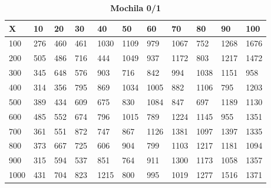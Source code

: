 \documentclass[10pt,letterpaper]{article}
\begin{document}
\newpage 
{}
\begin{center}
\begin{table}\renewcommand{\arraystretch}{2.5}
\caption{\large \textbf{Mochila 0/1}}
\centering
\begin{tabular} { |m{0.5cm}|m{1.3cm}|m{1.3cm}|m{1.3cm}|m{1.3cm}|m{1.3cm}|m{1.3cm}|m{1.3cm}|m{1.3cm}|m{1.3cm}|m{1.3cm}|} 
\hline
\rowcolor{Gray}
\centering \textbf{X} & \centering \textbf{10} & \centering \textbf{20} & \centering \textbf{30}\ & \centering \textbf{40} & \centering \textbf{50} & \centering \textbf{60}\ & \centering \textbf{70} & \centering \textbf{80} & \centering \textbf{90}\ & \textbf{100} \\\hline
\cellcolor{Gray}100 & \Large 276 & \Large 460 & \Large 461 & \Large 1030 & \Large 1109 & \Large 979 & \Large 1067 & \Large 752 & \Large 1268 & \Large 1676 \\
\hline
\cellcolor{Gray}200 & \Large 505 & \Large 486 & \Large 716 & \Large 444 & \Large 1049 & \Large 937 & \Large 1172 & \Large 803 & \Large 1217 & \Large 1472 \\
\hline
\cellcolor{Gray}300 & \Large 345 & \Large 648 & \Large 576 & \Large 903 & \Large 716 & \Large 842 & \Large 994 & \Large 1038 & \Large 1151 & \Large 958 \\
\hline
\cellcolor{Gray}400 & \Large 314 & \Large 356 & \Large 795 & \Large 869 & \Large 1034 & \Large 1005 & \Large 882 & \Large 1106 & \Large 795 & \Large 1203 \\
\hline
\cellcolor{Gray}500 & \Large 389 & \Large 434 & \Large 609 & \Large 675 & \Large 830 & \Large 1084 & \Large 847 & \Large 697 & \Large 1189 & \Large 1130 \\
\hline
\cellcolor{Gray}600 & \Large 485 & \Large 552 & \Large 674 & \Large 796 & \Large 1015 & \Large 789 & \Large 1224 & \Large 1145 & \Large 955 & \Large 1351 \\
\hline
\cellcolor{Gray}700 & \Large 361 & \Large 551 & \Large 872 & \Large 747 & \Large 867 & \Large 1126 & \Large 1381 & \Large 1097 & \Large 1397 & \Large 1335 \\
\hline
\cellcolor{Gray}800 & \Large 373 & \Large 667 & \Large 725 & \Large 606 & \Large 904 & \Large 799 & \Large 1103 & \Large 1217 & \Large 1181 & \Large 1094 \\
\hline
\cellcolor{Gray}900 & \Large 315 & \Large 594 & \Large 537 & \Large 851 & \Large 764 & \Large 911 & \Large 1300 & \Large 1173 & \Large 1058 & \Large 1357 \\
\hline
\cellcolor{Gray}1000 & \Large 431 & \Large 704 & \Large 823 & \Large 1215 & \Large 800 & \Large 995 & \Large 1019 & \Large 1277 & \Large 1516 & \Large 1371 \\
\hline
\end{tabular} \\
\end{table}
\end{center}
\end{document}
